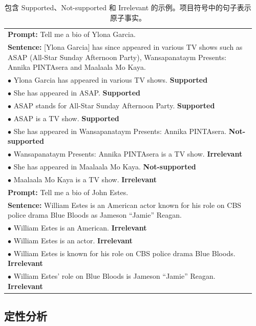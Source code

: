 \documentclass[11pt,UTF8,fontset=fandol]{ctexart}
\begin{document}
\begin{table}[H]\centering
\caption{包含 Supported、Not-supported 和 Irrelevant 的示例。项目符号中的句子表示原子事实。}
\label{tab:7}
\small
\begin{tabular}{p{0.96\linewidth}}
\toprule
\textbf{Prompt:} Tell me a bio of Ylona Garcia. \\
\textbf{Sentence:} [Ylona Garcia] has since appeared in various TV shows such as ASAP (All-Star Sunday Afternoon Party), Wansapanataym Presents: Annika PINTAsera and Maalaala Mo Kaya. \\
\quad$\bullet$ Ylona Garcia has appeared in various TV shows. \quad\textbf{Supported} \\
\quad$\bullet$ She has appeared in ASAP. \quad\textbf{Supported} \\
\quad$\bullet$ ASAP stands for All-Star Sunday Afternoon Party. \quad\textbf{Supported} \\
\quad$\bullet$ ASAP is a TV show. \quad\textbf{Supported} \\
\quad$\bullet$ She has appeared in Wansapanataym Presents: Annika PINTAsera. \quad\textbf{Not-supported} \\
\quad$\bullet$ Wansapanataym Presents: Annika PINTAsera is a TV show. \quad\textbf{Irrelevant} \\
\quad$\bullet$ She has appeared in Maalaala Mo Kaya. \quad\textbf{Not-supported} \\
\quad$\bullet$ Maalaala Mo Kaya is a TV show. \quad\textbf{Irrelevant} \\
\midrule
\textbf{Prompt:} Tell me a bio of John Estes. \\
\textbf{Sentence:} William Estes is an American actor known for his role on CBS police drama Blue Bloods as Jameson ``Jamie'' Reagan. \\
\quad$\bullet$ William Estes is an American. \quad\textbf{Irrelevant} \\
\quad$\bullet$ William Estes is an actor. \quad\textbf{Irrelevant} \\
\quad$\bullet$ William Estes is known for his role on CBS police drama Blue Bloods. \quad\textbf{Irrelevant} \\
\quad$\bullet$ William Estes' role on Blue Bloods is Jameson ``Jamie'' Reagan. \quad\textbf{Irrelevant} \\
\bottomrule
\end{tabular}
\end{table}

\subsection{定性分析}
\end{document}
